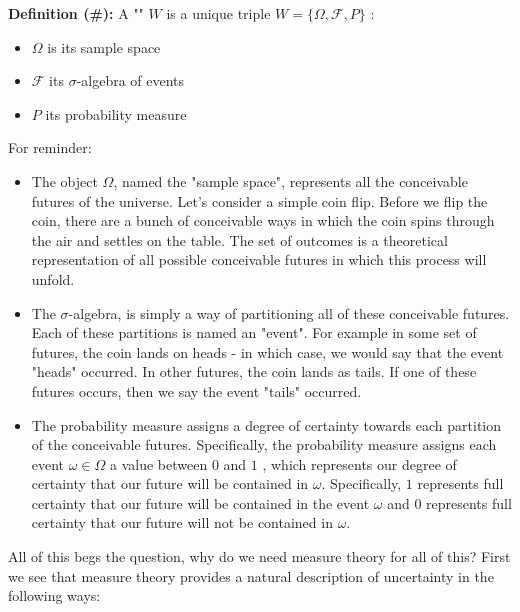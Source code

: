 	\textbf{Definition (\#\mydef):} A "" $W$ is a unique triple $W=\{\Omega, \mathcal{F}, P\}$ :
	\begin{itemize}
		\item $\Omega$ is its sample space
		\item $\mathcal{F}$ its $\sigma$-algebra of events
		\item $P$ its probability measure
	\end{itemize}
	For reminder:
	\begin{itemize}
		\item The object $\Omega$, named the "sample space", represents all the conceivable futures of the universe. Let's consider a simple coin flip. Before we flip the coin, there are a bunch of conceivable ways in which the coin spins through the air and settles on the table. The set of outcomes is a theoretical representation of all possible conceivable futures in which this process will unfold.
		
		\item The $\sigma$-algebra, is simply a way of partitioning all of these conceivable futures. Each of these partitions is named an "event". For example in some set of futures, the coin lands on heads - in which case, we would say that the event "heads" occurred. In other futures, the coin lands as tails. If one of these futures occurs, then we say the event "tails" occurred.
		
		\item The probability measure assigns a degree of certainty towards each partition of the conceivable futures. Specifically, the probability measure assigns each event $\omega \in \Omega$ a value between $0$ and $1$ , which represents our degree of certainty that our future will be contained in $\omega$. Specifically, $1$ represents full certainty that our future will be contained in the event $\omega$ and $0$ represents full certainty that our future will not be contained in $\omega$.
	\end{itemize}
	All of this begs the question, why do we need measure theory for all of this? First we see that measure theory provides a natural description of uncertainty in the following ways:
